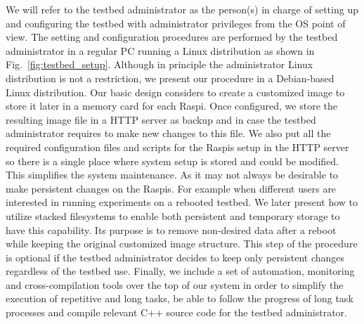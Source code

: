 We will refer to the
testbed administrator as the person(s) in charge of setting up and
configuring the testbed with administrator privileges from the \ac{OS}
point of view. The setting and configuration procedures are
performed by the testbed administrator in a regular \ac{PC} running a
Linux distribution as shown in Fig.~\ref{fig:testbed_setup}. Although in principle the administrator
Linux distribution is not a restriction, we present our procedure in a
Debian-based Linux distribution. Our basic design considers to create
a customized image to store it later in a memory card for each \ac{Raspi}.
Once configured, we store the resulting image file in a \ac{HTTP} server
as backup and in case the testbed administrator requires to make new
changes to this file. We also put all the required configuration files
and scripts for the \ac{Raspi}s setup in the \ac{HTTP} server so there is
a single place where system setup is stored and could be modified.
This simplifies the system maintenance.
As
it may not always be desirable to make persistent changes
on the \ac{Raspi}s. For example when different users are interested in
running experiments on a rebooted testbed. We later present how
to utilize stacked filesystems to enable both persistent and
temporary storage to have this capability. Its purpose is to
remove non-desired data after a reboot while keeping the original
customized image structure. This step of the procedure is optional if
the testbed administrator decides to keep only persistent changes regardless
of the testbed use. Finally, we include a set of automation, monitoring
and cross-compilation tools over the top of our system in order to simplify
the execution of repetitive and long tasks, be able to follow the progress
of long task processes and compile relevant C++ source code for the testbed
administrator.


